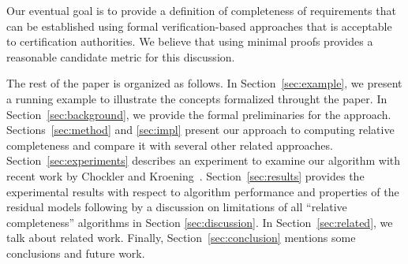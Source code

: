 \noindent Our eventual goal is to provide a definition of completeness of requirements that can be established using formal verification-based approaches that is acceptable to certification authorities.  We believe that using minimal proofs provides a reasonable candidate metric for this discussion.


The rest of the paper is organized as follows.  In Section~\ref{sec:example}, we present a running example to illustrate the concepts formalized throught the paper.  In Section~\ref{sec:background}, we provide the formal preliminaries for the approach.  Sections~\ref{sec:method} and \ref{sec:impl} present our approach to computing relative completeness and compare it with several other related approaches.  Section~\ref{sec:experiments} describes an experiment to examine our algorithm with recent work by Chockler and Kroening~\cite{chockler2010coverage}. Section~\ref{sec:results} provides the experimental results with respect to algorithm performance and properties of the residual models following by a discussion on limitations of all ``relative completeness'' algorithms in Section \ref{sec:discussion}.  In Section~\ref{sec:related}, we talk about related work.  Finally, Section~\ref{sec:conclusion} mentions some conclusions and future work.

